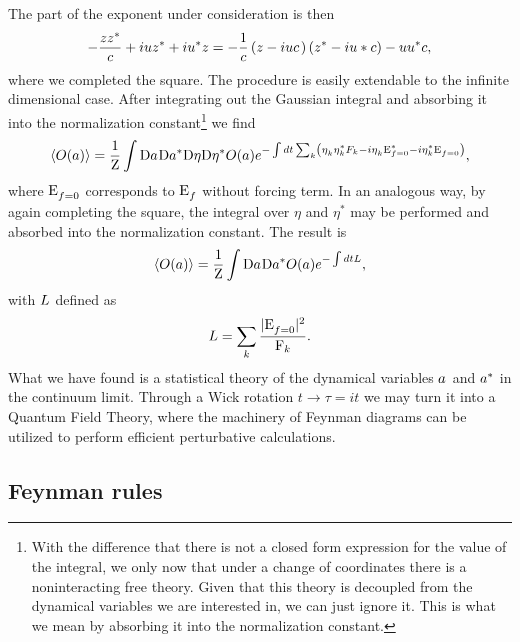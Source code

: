 The part of the exponent under consideration is then
\begin{equation}
    -\frac{zz^*}{c} + iuz^* + iu^*z = -\frac{1}{c} \left(z - iuc \phantom{z^*}\hspace{-3mm}\right)\left(z^* - iu*c \right) - uu^*c,
\end{equation}
where we completed the square. The procedure is easily extendable to the infinite dimensional case. After integrating out the Gaussian integral and absorbing it into the 
normalization constant\footnote{With the difference that there is not a closed form expression 
for the value of the integral, we only now that under a change of coordinates there is a noninteracting free theory. Given that this theory is decoupled 
from the dynamical variables we are interested in,
we can just ignore it. This is what we mean by absorbing it into the normalization constant.}  we find
\begin{equation}
    \langle O(a) \rangle = \frac{1}{\mathrm{Z}}\int\mathrm{D} a^{} \mathrm{D}a^{*}\mathrm{D} \eta\mathrm{D} \eta^*  O(a)
    e^{-\int dt \sum_k \left( \eta_k^{}\eta_k^* F_k - i\eta_k^{}\mathrm{E}_{f=0}^* -i\eta_k^* \mathrm{E}_{f=0}^{} \right)},
    \label{expect3}
\end{equation}
where $\mathrm{E}_{f=0}^{}$ corresponds to $\mathrm{E}_f^{}$ without forcing term. In an analogous way, by again completing the square, the integral over $\eta$ and $\eta^*$ may be performed and 
absorbed into the normalization constant.
The result is 
\begin{equation}
    \langle O(a) \rangle = \frac{1}{\mathrm{Z}}\int\mathrm{D} a^{} \mathrm{D}a^{*} O(a)
    e^{-\int dt L},
    \label{expect}
\end{equation} 
with $L$ defined as 
\begin{equation}
    L = \sum_k \frac{|\mathrm{E}_{f=0}^{}|^2}{\mathrm{F}_k}.
    \label{Lag}
\end{equation}
What we have found is a statistical theory of the dynamical variables $a^{}$ and $a^{*}$ in the continuum limit. Through a Wick rotation $t \rightarrow \tau = it$ we 
may turn it into a Quantum Field Theory, where the machinery of Feynman diagrams can be utilized to perform efficient perturbative calculations.\\

\subsection{Feynman rules} 

